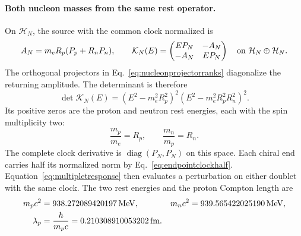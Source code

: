 \documentclass[aps,prx,onecolumn,10pt,notitlepage,nofootinbib,longbibliography]{revtex4-2}
\numberwithin{equation}{section}
\numberwithin{table}{section}
\newcommand{\diag}{\operatorname{diag}}
\newcommand{\MeV}{\,\mathrm{MeV}}
\newcommand{\fm}{\,\mathrm{fm}}
\newcommand{\lamP}{\lambda_p}
\begin{document}
\paragraph*{Both nucleon masses from the same rest operator.}
On $\mathcal H_N$, the source with the common clock normalized is
\begin{equation}
 A_N=m_eR_p(P_p+R_nP_n),\qquad
 \mathcal K_N(E)=
 \begin{pmatrix}EP_N&-A_N\\-A_N&EP_N\end{pmatrix}
 \quad\hbox{on }\mathcal H_N\oplus\mathcal H_N.
 \label{eq:nucleonoperator}
\end{equation}
The orthogonal projectors in Eq.~\eqref{eq:nucleonprojectorranks} diagonalize the returning amplitude. The determinant is therefore
\begin{equation}
 \det\mathcal K_N(E)
 =(E^2-m_e^2R_p^2)^2(E^2-m_e^2R_p^2R_n^2)^2.
 \label{eq:nucleonrestzero}
\end{equation}
Its positive zeros are the proton and neutron rest energies, each with the spin multiplicity two:
\begin{equation}
 \frac{m_p}{m_e}=R_p,\qquad \frac{m_n}{m_p}=R_n.
 \label{eq:nucleonmassratios}
\end{equation}
The complete clock derivative is $\diag(P_N,P_N)$ on this space. Each chiral end carries half its normalized norm by Eq.~\eqref{eq:endpointclockhalf}. Equation~\eqref{eq:multipletresponse} then evaluates a perturbation on either doublet with the same clock. The two rest energies and the proton Compton length are
\begin{align}
 m_pc^2&=938.272089420197\MeV,&
 m_nc^2&=939.565422025190\MeV,\notag\\
 \lamP&=\frac{\hbar}{m_pc}=0.210308910053202\fm.
\end{align}
\end{document}
